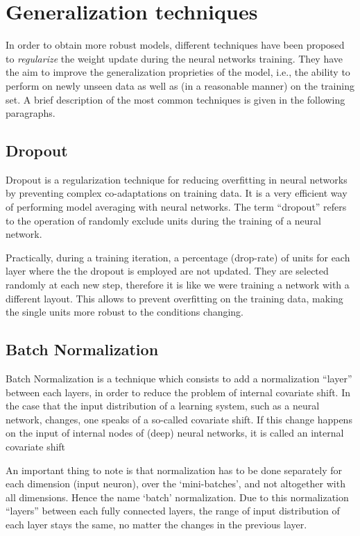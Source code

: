 \section{Generalization techniques}

In order to obtain more robust models, different techniques have been proposed to \textit{regularize} the weight update during the neural networks training. They have the aim to improve the generalization proprieties of the model, i.e., the ability to perform on newly unseen data as well as (in a reasonable manner) on the training set. A brief description of the most common techniques is given in the following paragraphs.

\subsection{Dropout}

Dropout is a regularization technique for reducing overfitting in neural networks by preventing complex co-adaptations on training data. It is a very efficient way of performing model averaging with neural networks. The term ``dropout'' refers to the operation of randomly exclude units during the training of a neural network.

Practically, during a training iteration, a percentage (drop-rate) of units for each layer where the the dropout is employed are not updated. They are selected randomly at each new step, therefore it is like we were training a network with a different layout. This allows to prevent overfitting on the training data, making  the single units more robust to the conditions changing.
 
\subsection{Batch Normalization}
Batch Normalization is a technique which consists to add a normalization “layer” between each layers, in order to reduce the problem of internal covariate shift. In the case that the input distribution of a learning system, such as a neural network, changes, one speaks of a so-called covariate shift. If this change happens on the input of internal nodes of (deep) neural networks, it is called an internal covariate shift

An important thing to note is that normalization has to be done separately for each dimension (input neuron), over the ‘mini-batches’, and not altogether with all dimensions. Hence the name ‘batch’ normalization.
Due to this normalization “layers” between each fully connected layers, the range of input distribution of each layer stays the same, no matter the changes in the previous layer. 

